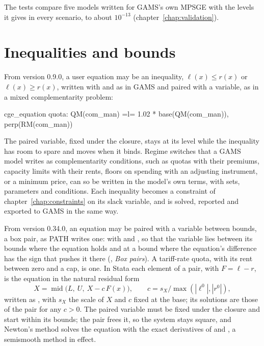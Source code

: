 The tests compare five models written for GAMS's own MPSGE with the levels
it gives in every scenario, to about $10^{-13}$
(chapter~\ref{chap:validation}).

\section{Inequalities and bounds}\label{sec:userineq}

From version 0.9.0, a user equation may be an inequality, $\ell(x) \le r(x)$
or $\ell(x) \ge r(x)$, written with  and  as in GAMS and paired
with a variable, as in a mixed complementarity problem:
\begin{stcode}
cge_equation quota: QM(com_man) =l= 1.02 * base(QM(com_man)), perp(RM(com_man))
\end{stcode}
The paired variable, fixed under the closure, stays at its level while the
inequality has room to spare and moves when it binds. Regime switches that a
GAMS model writes as complementarity conditions, such as quotas with their
premiums, capacity limits with their rents, floors on spending with an
adjusting instrument, or a minimum price, can so be written in the model's own
terms, with sets, parameters and conditions. Each inequality becomes a
constraint of chapter~\ref{chap:constraints} on its slack variable, and is
solved, reported and exported to GAMS in the same way.

From version 0.34.0, an equation may be paired with a variable between
bounds, a box pair, as PATH writes one: \cmd{)} with
 and , so that the variable lies between its
bounds where the equation holds and at a bound where the equation's
difference has the sign that pushes it there (, \emph{Box
pairs}). A tariff-rate quota, with its rent between zero and a cap, is one.
In Stata each element of a pair, with $F = \ell - r$, is the equation in the
natural residual form
\begin{equation*}
X = \operatorname{mid}\bigl(L,\ U,\ X - c\,F(x)\bigr), \qquad c = s_X / \max(|\ell^0|, |r^0|),
\end{equation*}
written as , with $s_X$ the scale of $X$ and
$c$ fixed at the base; its solutions are those of the pair for any $c > 0$.
The paired variable must be fixed under the closure and start within its
bounds; the pair frees it, so the system stays square, and Newton's method
solves the equation with the exact derivatives of  and
, a semismooth method in effect.

